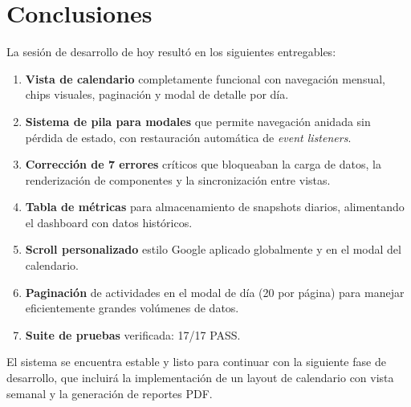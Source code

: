\documentclass[12pt,a4paper]{article}
\begin{document}
\section{Conclusiones}

La sesión de desarrollo de hoy resultó en los siguientes entregables:

\begin{enumerate}[leftmargin=*]
    \item \textbf{Vista de calendario} completamente funcional con navegación mensual, chips visuales, paginación y modal de detalle por día.
    \item \textbf{Sistema de pila para modales} que permite navegación anidada sin pérdida de estado, con restauración automática de \textit{event listeners}.
    \item \textbf{Corrección de 7 errores} críticos que bloqueaban la carga de datos, la renderización de componentes y la sincronización entre vistas.
    \item \textbf{Tabla de métricas} para almacenamiento de snapshots diarios, alimentando el dashboard con datos históricos.
    \item \textbf{Scroll personalizado} estilo Google aplicado globalmente y en el modal del calendario.
    \item \textbf{Paginación} de actividades en el modal de día (20 por página) para manejar eficientemente grandes volúmenes de datos.
    \item \textbf{Suite de pruebas} verificada: 17/17 PASS.
\end{enumerate}

El sistema se encuentra estable y listo para continuar con la siguiente fase de desarrollo, que incluirá la implementación de un layout de calendario con vista semanal y la generación de reportes PDF.
\end{document}
